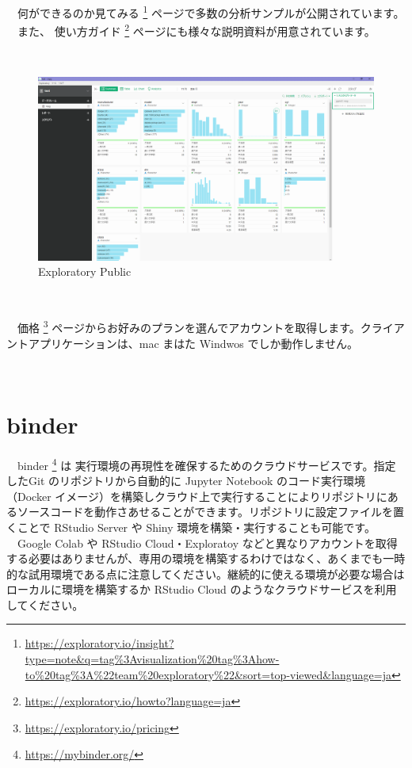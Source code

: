 \documentclass[
  12pt,
]{book}
\DeclareRobustCommand{\href}[2]{#2\footnote{\url{#1}}}
\begin{document}
　\href{https://exploratory.io/insight?type=note\&q=tag\%3Avisualization\%20tag\%3Ahow-to\%20tag\%3A\%22team\%20exploratory\%22\&sort=top-viewed\&language=ja}{何ができるのか見てみる } ページで多数の分析サンプルが公開されています。\\
　また、 \href{https://exploratory.io/howto?language=ja}{使い方ガイド } ページにも様々な説明資料が用意されています。

　\\

\begin{figure}[H]

{\centering \includegraphics[width=0.8\linewidth,]{fig/Exploratory} 

}

\caption{Exploratory Public}\label{fig:unnamed-chunk-159}
\end{figure}

　

　\href{https://exploratory.io/pricing}{価格 } ページからお好みのプランを選んでアカウントを取得します。クライアントアプリケーションは、mac まはた Windwos でしか動作しません。

　

\hypertarget{binder}{%
\section{binder}\label{binder}}

　\href{https://mybinder.org/}{binder } は 実行環境の再現性を確保するためのクラウドサービスです。指定したGit のリポジトリから自動的に Jupyter Notebook のコード実行環境（Docker イメージ）を構築しクラウド上で実行することによりリポジトリにあるソースコードを動作さあせることができます。リポジトリに設定ファイルを置くことで RStudio Server や Shiny 環境を構築・実行することも可能です。\\
　Google Colab や RStudio Cloud・Exploratoy などと異なりアカウントを取得する必要はありませんが、専用の環境を構築するわけではなく、あくまでも一時的な試用環境である点に注意してください。継続的に使える環境が必要な場合は ローカルに環境を構築するか RStudio Cloud のようなクラウドサービスを利用してください。
\end{document}
